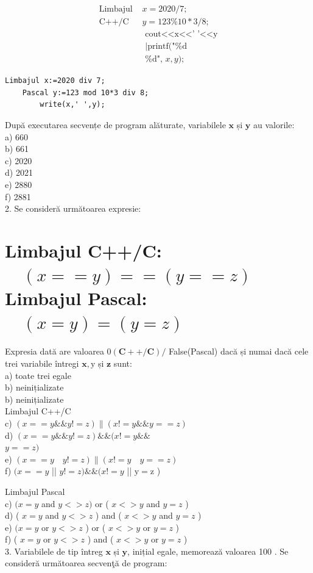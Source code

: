\documentclass[10pt]{article}
\begin{document}
$$
\begin{array}{cl}
\text { Limbajul } & x=2020 / 7 ; \\
\text { C++/C } & y=123 \% 10 * 3 / 8 ; \\
& \text { cout<<x<<' '<<y } \\
& \text { |printf("\%d } \\
& \text { \%d", } x, y) ;
\end{array}
$$

\begin{verbatim}
Limbajul x:=2020 div 7;
    Pascal y:=123 mod 10*3 div 8;
        write(x,' ',y);
\end{verbatim}

După executarea secvențe de program alăturate, variabilele $\mathbf{x}$ și $\mathbf{y}$ au valorile:\\
a) 660\\
b) 661\\
c) 2020\\
d) 2021\\
e) 2880\\
f) 2881\\
2. Se consideră următoarea expresie:

\section*{Limbajul C++/C: $\quad(x==y)==(y==z) \quad$ Limbajul Pascal: $\quad(x=y)=(y=z)$}
Expresia dată are valoarea $0(\mathbf{C}++/ \mathbf{C}) /$ False(Pascal) dacă și numai dacă cele trei variabile întregi $\mathbf{x}, \mathrm{y}$ și $\mathbf{z}$ sunt:\\
a) toate trei egale\\
b) neinițializate\\
b) neinițializate\\
Limbajul C++/C\\
c) $(x==y \& \& y!=z) \|(x!=y \& \& y==z)$\\
d) $(x==y \& \& y!=z) \& \&(x!=y \& \&$\\
$y==z)$\\
e) $(x==y \quad y!=z) \|(x!=y \quad y==z)$\\
f) $(x==y$ || $y!=z) \& \&(x!=y$ || $\mathrm{y}=\mathrm{z}$ )

Limbajul Pascal\\
c) $(x=y$ and $y<>z)$ or ( $x<>y$ and $y=z$ )\\
d) ( $x=y$ and $y<>z$ ) and ( $x<>y$ and $y=z$ )\\
e) $(x=y$ or $y<>z$ ) or ( $x<>y$ or $y=z$ )\\
f) ( $x=y$ or $y<>z$ ) and ( $x<>y$ or $y=z$ )\\
3. Variabilele de tip întreg $\mathbf{x}$ și $\mathbf{y}$, inițial egale, memorează valoarea 100 . Se consideră următoarea secvenţă de program:
\end{document}
